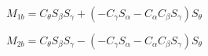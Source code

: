 




%
%
%

\begin{equation}
M_{1b} = C_{\theta} S_{\beta} S_{\gamma}+(-C_{\gamma}
 S_{\alpha}-C_{\alpha} C_{\beta} S_{\gamma}) S_{\theta}
\end{equation}

\begin{equation}
 M_{2b} = C_{\theta} S_{\beta} S_{\gamma}-(-C_{\gamma}
  S_{\alpha}-C_{\alpha} C_{\beta} S_{\gamma}) S_{\theta}
\end{equation}

